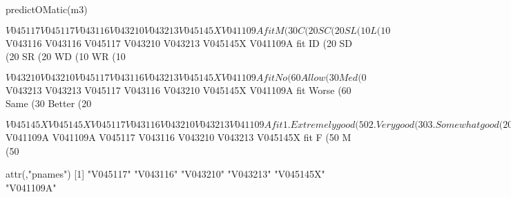 \begin{Schunk}
\begin{Sinput}
 predictOMatic(m3)
\end{Sinput}
\begin{Soutput}
$V045117
         V045117 V043116 V043210 V043213          V045145X V041109A        fit
M (30%)        M      ID      No   Worse 1. Extremely good        F -18.476144
C (20%)        C      ID      No   Worse 1. Extremely good        F  -6.589442
SC (20%)      SC      ID      No   Worse 1. Extremely good        F -13.947726
SL (10%)      SL      ID      No   Worse 1. Extremely good        F -21.712903
L (10%)        L      ID      No   Worse 1. Extremely good        F -34.875946

$V043116
         V043116 V045117 V043210 V043213          V045145X V041109A       fit
ID (20%)      ID       M      No   Worse 1. Extremely good        F -18.47614
SD (20%)      SD       M      No   Worse 1. Extremely good        F -40.84086
SR (20%)      SR       M      No   Worse 1. Extremely good        F  41.50739
WD (10%)      WD       M      No   Worse 1. Extremely good        F -16.23570
WR (10%)      WR       M      No   Worse 1. Extremely good        F  26.39827

$V043210
            V043210 V045117 V043116 V043213          V045145X V041109A       fit
No (60%)         No       M      ID   Worse 1. Extremely good        F -18.47614
Allow (30%)   Allow       M      ID   Worse 1. Extremely good        F -26.38670
Med (0%)        Med       M      ID   Worse 1. Extremely good        F -19.60610

$V043213
             V043213 V045117 V043116 V043210          V045145X V041109A         fit
Worse (60%)    Worse       M      ID      No 1. Extremely good        F -18.4761440
Same (30%)      Same       M      ID      No 1. Extremely good        F  -0.7752059
Better (20%)  Better       M      ID      No 1. Extremely good        F   6.6065102

$V045145X
                                                      V045145X V045117 V043116 V043210 V043213 V041109A       fit
1. Extremely good (50%)                      1. Extremely good       M      ID      No   Worse        F -18.47614
2. Very good (30%)                                2. Very good       M      ID      No   Worse        F -26.09885
3. Somewhat good (20%)                        3. Somewhat good       M      ID      No   Worse        F -32.98141
4. Not very good (0%)                         4. Not very good       M      ID      No   Worse        F -33.14812
7. Don't feel anything {VOL} (0%) 7. Don't feel anything {VOL}       M      ID      No   Worse        F -44.71372

$V041109A
        V041109A V045117 V043116 V043210 V043213          V045145X       fit
F (50%)        F       M      ID      No   Worse 1. Extremely good -18.47614
M (50%)        M       M      ID      No   Worse 1. Extremely good -18.76006

attr(,"pnames")
[1] "V045117"  "V043116"  "V043210"  "V043213"  "V045145X" "V041109A"
\end{Soutput}
\end{Schunk}
